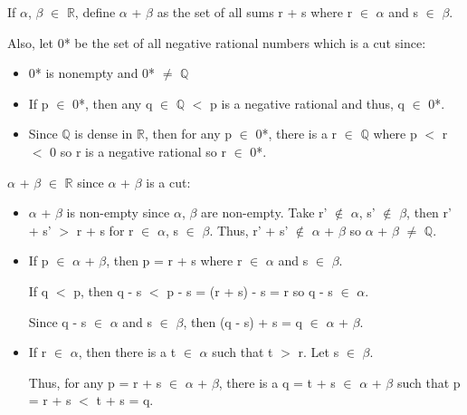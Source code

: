 	\begin{adjustbox}{minipage=16cm, right, vspace=0.1cm 0cm}
		If $\alpha$, $\beta$ $\in$ $\mathbb{R}$, define $\alpha$ + $\beta$ as the set of all
		sums r + s where r $\in$ $\alpha$ and s $\in$ $\beta$.

		Also, let 0* be the set of all negative rational numbers which is a cut since:
		
			\begin{itemize}[leftmargin=1cm, itemsep=0.1cm]
				\item 0* is nonempty and 0* $\not =$ $\mathbb{Q}$

				\item If p $\in$ 0*, then any q $\in$ $\mathbb{Q}$ $<$ p is a negative rational
					and thus, q $\in$ 0*.

				\item Since $\mathbb{Q}$ is dense in $\mathbb{R}$, then for any p $\in$ 0*,
					there is a r $\in$ $\mathbb{Q}$ where p $<$ r $<$ 0 so r is a
					negative rational so r $\in$ 0*.
			\end{itemize}

		$\alpha$ + $\beta$ $\in$ $\mathbb{R}$ since $\alpha$ + $\beta$ is a cut:

			\begin{itemize}[leftmargin=1cm, itemsep=0.1cm]
				\item $\alpha$ + $\beta$ is non-empty since $\alpha$, $\beta$ are non-empty.
					Take r' $\not \in$ $\alpha$, s' $\not \in$ $\beta$, then
					r' + s' $>$ r + s for r $\in$ $\alpha$, s $\in$ $\beta$.
					Thus, r' + s' $\not \in$ $\alpha$ + $\beta$ so
					$\alpha$ + $\beta$ $\neq$ $\mathbb{Q}$.

				\item If p $\in$ $\alpha$ + $\beta$, then p = r + s where r $\in$ $\alpha$
					and s $\in$ $\beta$.

					If q $<$ p, then q - s $<$ p - s = (r + s) - s = r so q - s $\in$ $\alpha$.

					Since q - s $\in$ $\alpha$ and s $\in$ $\beta$, then
					(q - s) + s = q $\in$ $\alpha$ + $\beta$.

				\item If r $\in$ $\alpha$, then there is a t $\in$ $\alpha$ such that t $>$ r.
					Let s $\in$ $\beta$.

					Thus, for any p = r + s $\in$ $\alpha$ + $\beta$, there is a
					q = t + s $\in$ $\alpha$ + $\beta$ such that p = r + s $<$ t + s = q.
			\end{itemize}


\end{adjustbox}
